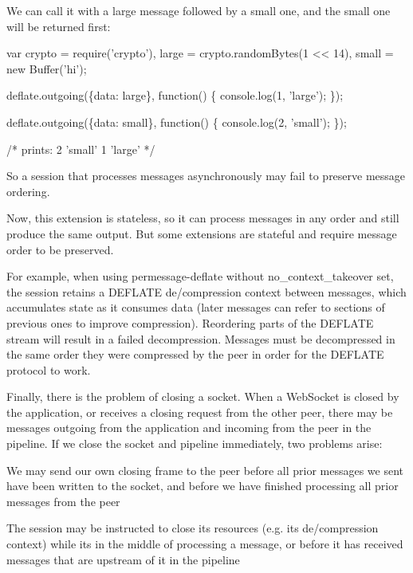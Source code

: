 We can call it with a large message followed by a small one, and the small one will be returned first\+:


\begin{DoxyCode}
var crypto = require('crypto'),
    large  = crypto.randomBytes(1 << 14),
    small  = new Buffer('hi');

deflate.outgoing(\{data: large\}, function() \{
  console.log(1, 'large');
\});

deflate.outgoing(\{data: small\}, function() \{
  console.log(2, 'small');
\});

/* prints:  2 'small'
            1 'large' */
\end{DoxyCode}


So a session that processes messages asynchronously may fail to preserve message ordering.

Now, this extension is stateless, so it can process messages in any order and still produce the same output. But some extensions are stateful and require message order to be preserved.

For example, when using {\ttfamily permessage-\/deflate} without {\ttfamily no\+\_\+context\+\_\+takeover} set, the session retains a D\+E\+F\+L\+A\+TE de/compression context between messages, which accumulates state as it consumes data (later messages can refer to sections of previous ones to improve compression). Reordering parts of the D\+E\+F\+L\+A\+TE stream will result in a failed decompression. Messages must be decompressed in the same order they were compressed by the peer in order for the D\+E\+F\+L\+A\+TE protocol to work.

Finally, there is the problem of closing a socket. When a Web\+Socket is closed by the application, or receives a closing request from the other peer, there may be messages outgoing from the application and incoming from the peer in the pipeline. If we close the socket and pipeline immediately, two problems arise\+:


\begin{DoxyItemize}
\item We may send our own closing frame to the peer before all prior messages we sent have been written to the socket, and before we have finished processing all prior messages from the peer
\item The session may be instructed to close its resources (e.\+g. its de/compression context) while it\textquotesingle{}s in the middle of processing a message, or before it has received messages that are upstream of it in the pipeline
\end{DoxyItemize}

